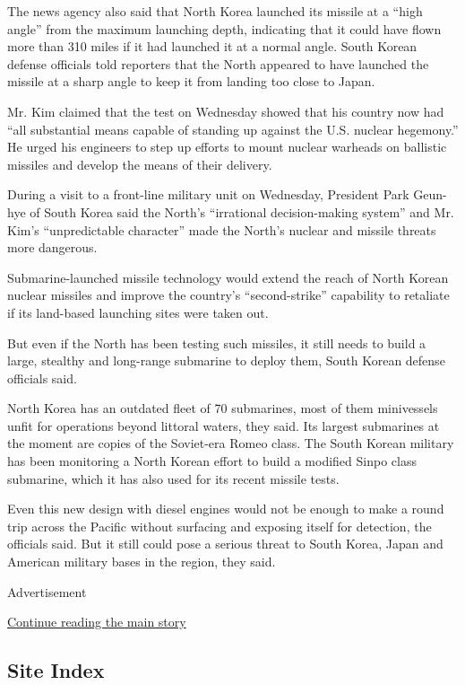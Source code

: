The news agency also said that North Korea launched its missile at a
``high angle'' from the maximum launching depth, indicating that it
could have flown more than 310 miles if it had launched it at a normal
angle. South Korean defense officials told reporters that the North
appeared to have launched the missile at a sharp angle to keep it from
landing too close to Japan.

Mr. Kim claimed that the test on Wednesday showed that his country now
had ``all substantial means capable of standing up against the U.S.
nuclear hegemony.'' He urged his engineers to step up efforts to mount
nuclear warheads on ballistic missiles and develop the means of their
delivery.

During a visit to a front-line military unit on Wednesday, President
Park Geun-hye of South Korea said the North's ``irrational
decision-making system'' and Mr. Kim's ``unpredictable character'' made
the North's nuclear and missile threats more dangerous.

Submarine-launched missile technology would extend the reach of North
Korean nuclear missiles and improve the country's ``second-strike''
capability to retaliate if its land-based launching sites were taken
out.

But even if the North has been testing such missiles, it still needs to
build a large, stealthy and long-range submarine to deploy them, South
Korean defense officials said.

North Korea has an outdated fleet of 70 submarines, most of them
minivessels unfit for operations beyond littoral waters, they said. Its
largest submarines at the moment are copies of the Soviet-era Romeo
class. The South Korean military has been monitoring a North Korean
effort to build a modified Sinpo class submarine, which it has also used
for its recent missile tests.

Even this new design with diesel engines would not be enough to make a
round trip across the Pacific without surfacing and exposing itself for
detection, the officials said. But it still could pose a serious threat
to South Korea, Japan and American military bases in the region, they
said.

Advertisement

\protect\hyperlink{after-bottom}{Continue reading the main story}

\hypertarget{site-index}{%
\subsection{Site Index}\label{site-index}}

